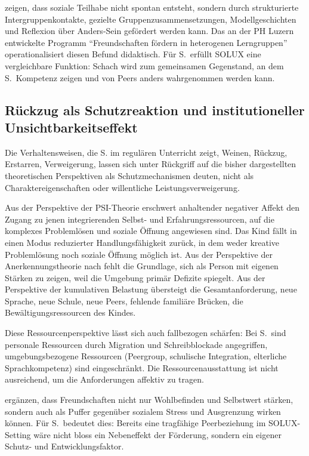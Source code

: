 \documentclass[ngerman, a4paper]{article}
\begin{document}
\textcite[S.\,35--40]{tschoppbuholzergruetter2022intergruppenkontakt}
zeigen, dass soziale Teilhabe nicht spontan entsteht, sondern durch
strukturierte Intergruppenkontakte, gezielte Gruppenzusammensetzungen,
Modellgeschichten und Reflexion über Anders-Sein gefördert werden kann.
Das an der PH Luzern entwickelte Programm \enquote{Freundschaften fördern
  in heterogenen Lerngruppen} operationalisiert diesen Befund didaktisch.
Für S.\ erfüllt SOLUX eine vergleichbare Funktion: Schach wird zum
gemeinsamen Gegenstand, an dem S.\ Kompetenz zeigen und von Peers anders
wahrgenommen werden kann.

\subsection{Rückzug als Schutzreaktion und institutioneller
  Unsichtbarkeitseffekt}

Die Verhaltensweisen, die S. im regulären Unterricht zeigt, Weinen, Rückzug, Erstarren,
Verweigerung, lassen sich unter Rückgriff auf die bisher dargestellten theoretischen
Perspektiven als Schutzmechanismen deuten, nicht als Charaktereigenschaften oder
willentliche Leistungsverweigerung.

Aus der Perspektive der PSI-Theorie erschwert anhaltender negativer Affekt
den Zugang zu jenen integrierenden Selbst- und Erfahrungsressourcen, auf
die komplexes Problemlösen und soziale Öffnung angewiesen sind. Das Kind
fällt in einen Modus reduzierter Handlungsfähigkeit zurück, in dem weder
kreative Problemlösung noch soziale Öffnung möglich ist. Aus der
Perspektive der Anerkennungstheorie nach
\textcite[S.\,90\psq]{grossrieder2010anerkennung} fehlt die Grundlage, sich als Person
mit eigenen Stärken zu zeigen, weil die Umgebung primär Defizite spiegelt. Aus der
Perspektive der kumulativen Belastung übersteigt die Gesamtanforderung,
neue Sprache, neue Schule, neue Peers, fehlende familiäre Brücken, die
Bewältigungsressourcen des Kindes.

Diese Ressourcenperspektive lässt sich auch fallbezogen schärfen: Bei
S.\ sind personale Ressourcen durch Migration und Schreibblockade
angegriffen, umgebungsbezogene Ressourcen (Peergroup, schulische
Integration, elterliche Sprachkompetenz) sind eingeschränkt. Die
Ressourcenausstattung ist nicht ausreichend, um die Anforderungen
affektiv zu tragen.

\textcite[S.\,10--11]{gysinscherzinger2022freundschaftenwertvoll}
ergänzen, dass Freundschaften nicht nur Wohlbefinden und Selbstwert
stärken, sondern auch als Puffer gegenüber sozialem Stress und
Ausgrenzung wirken können. Für S.\ bedeutet dies: Bereits eine tragfähige
Peerbeziehung im SOLUX-Setting wäre nicht bloss ein Nebeneffekt der
Förderung, sondern ein eigener Schutz- und Entwicklungsfaktor.
\end{document}
